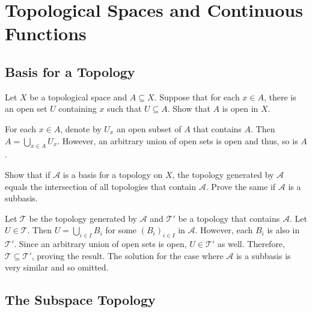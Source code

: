 \section{Topological Spaces and Continuous Functions}

\setcounter{subsection}{12}
\subsection{Basis for a Topology}

\begin{exercise}
	Let $X$ be a topological space and $A\subseteq X$. Suppose that for each $x\in A$, there is an open set $U$ containing $x$ such that $U\subseteq A$. Show that $A$ is open in $X$.
\end{exercise}
\begin{solution*}
	For each $x\in A$, denote by $U_x$ an open subset of $A$ that contains $A$. Then $A = \bigcup_{x\in A} U_x$. However, an arbitrary union of open sets is open and thus, so is $A$.
\end{solution*}

\setcounter{exercise}{4}
\begin{exercise}
	Show that if $\mathcal{A}$ is a basis for a topology on $X$, the topology generated by $\mathcal{A}$ equals the intersection of all topologies that contain $\mathcal{A}$. Prove the same if $\mathcal{A}$ is a subbasis.
\end{exercise}
\begin{solution*}
	Let $\mathcal{T}$ be the topology generated by $\mathcal{A}$ and $\mathcal{T}'$ be a topology that contains $\mathcal{A}$. Let $U\in\mathcal{T}$. Then $U=\bigcup_{i\in I} B_i$ for some $(B_i)_{i\in I}$ in $\mathcal{A}$. However, each $B_i$ is also in $\mathcal{T}'$. Since an arbitrary union of open sets is open, $U\in\mathcal{T'}$ as well. Therefore, $\mathcal{T}\subseteq\mathcal{T}'$, proving the result. The solution for the case where $\mathcal{A}$ is a subbasis is very similar and so omitted.
\end{solution*}


\setcounter{subsection}{15}
\subsection{The Subspace Topology}


